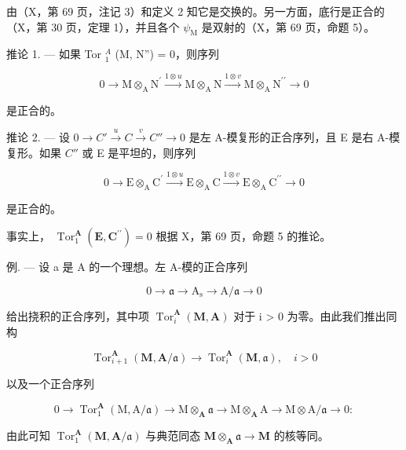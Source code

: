 由（X，第 69 页，注记 3）和定义 2 知它是交换的。另一方面，底行是正合的（X，第 30 页，定理 1），并且各个 \(\psi_{\mathrm{M}}\) 是双射的（X，第 69 页，命题 5）。

推论 1. --- 如果 Tor \(_{1}^{A}\) (M, N'') = 0，则序列

\[
0 \longrightarrow \mathrm{M} \otimes_ {\mathrm{A}} \mathrm{N} ^ {\prime} \xrightarrow {1 \otimes u} \mathrm{M} \otimes_ {\mathrm{A}} \mathrm{N} \xrightarrow {1 \otimes v} \mathrm{M} \otimes_ {\mathrm{A}} \mathrm{N} ^ {\prime \prime} \longrightarrow 0
\]

是正合的。

推论 2. --- 设 \(0 \to C' \xrightarrow{u} C \xrightarrow{v} C'' \to 0\) 是左 A-模复形的正合序列，且 E 是右 A-模复形。如果 \(C''\) 或 E 是平坦的，则序列

\[
0 \longrightarrow \mathrm{E} \otimes_ {\mathrm{A}} \mathrm{C} ^ {\prime} \xrightarrow {1 \otimes u} \mathrm{E} \otimes_ {\mathrm{A}} \mathrm{C} \xrightarrow {1 \otimes v} \mathrm{E} \otimes_ {\mathrm{A}} \mathrm{C} ^ {\prime \prime} \longrightarrow 0
\]

是正合的。

事实上， \(\operatorname{Tor}_1^{\mathbf{A}}(\mathbf{E},\mathbf{C}^{\prime \prime}) = 0\) 根据 X，第 69 页，命题 5 的推论。

例. --- 设 a 是 A 的一个理想。左 A-模的正合序列

\[
0 \rightarrow \mathfrak {a} \rightarrow \mathrm{A} _ {\mathrm{s}} \rightarrow \mathrm{A} / \mathfrak {a} \rightarrow 0
\]

给出挠积的正合序列，其中项 \(\operatorname{Tor}_{i}^{\mathbf{A}}(\mathbf{M},\mathbf{A})\) 对于 i \textgreater{} 0 为零。由此我们推出同构

\[
\operatorname{Tor} _ {i + 1} ^ {\mathbf {A}} (\mathbf {M}, \mathbf {A} / \mathfrak {a}) \rightarrow \operatorname{Tor} _ {i} ^ {\mathbf {A}} (\mathbf {M}, \mathfrak {a}), \quad i > 0
\]

以及一个正合序列

\[
0 \rightarrow \operatorname{Tor} _ {1} ^ {\mathbf {A}} (\mathrm{M}, \mathrm{A} / \mathfrak {a}) \rightarrow \mathrm{M} \otimes_ {\mathbf {A}} \mathfrak {a} \rightarrow \mathrm{M} \otimes_ {\mathbf {A}} \mathrm{A} \rightarrow \mathrm{M} \otimes \mathrm{A} / \mathfrak {a} \rightarrow 0:
\]

由此可知 \(\operatorname{Tor}_{1}^{\mathbf{A}}(\mathbf{M},\mathbf{A}/\mathfrak{a})\) 与典范同态 \(\mathbf{M}\otimes_{\mathbf{A}}\mathfrak{a}\to\mathbf{M}\) 的核等同。

